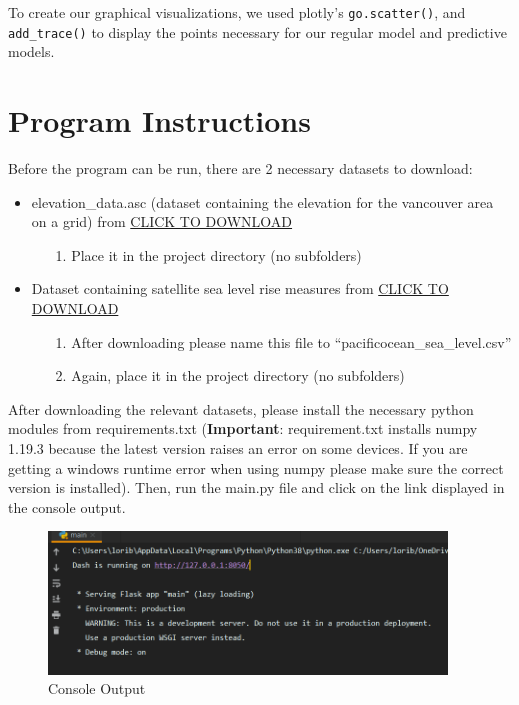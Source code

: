 \documentclass[fontsize=11pt]{article}
\begin{document}
    To create our graphical visualizations, we used plotly’s \texttt{go.scatter()}, and \texttt{add\_trace()} to display the points necessary for our regular model and predictive models.

    \section*{Program Instructions}
    Before the program can be run, there are 2 necessary datasets to download:
    \begin{itemize}
        \item elevation\_data.asc (dataset containing the elevation for the vancouver area on a grid) from
        \href{https://drive.google.com/file/d/1WTpvDGTbbd-y1P-TbWe_gyFAXLlJWBnU/view?usp=sharing}{CLICK TO DOWNLOAD}
        \begin{itemize}
            \item[1.] Place it in the project directory (no subfolders)
        \end{itemize}
        \item Dataset containing satellite sea level rise measures from
        \href{https://www.star.nesdis.noaa.gov/socd/lsa/SeaLevelRise/slr/slr_sla_np_keep_txj1j2.csv}{CLICK TO DOWNLOAD}
        \begin{itemize}
            \item[1.] After downloading please name this file to “pacificocean\_sea\_level.csv”
            \item[2.] Again, place it in the project directory (no subfolders)
        \end{itemize}
    \end{itemize}

    After downloading the relevant datasets, please install the necessary python modules from requirements.txt (\textbf{Important}: requirement.txt installs numpy 1.19.3 because the latest version raises an error on some devices. If you are getting a windows runtime error when using numpy please make sure the correct version is installed).
    Then, run the main.py file and click on the link displayed in the console output. \\
    \begin{figure}[h]
        \centering
        \includegraphics[width=300pt]{console.png}
        \caption{Console Output}
    \end{figure}
\end{document}
